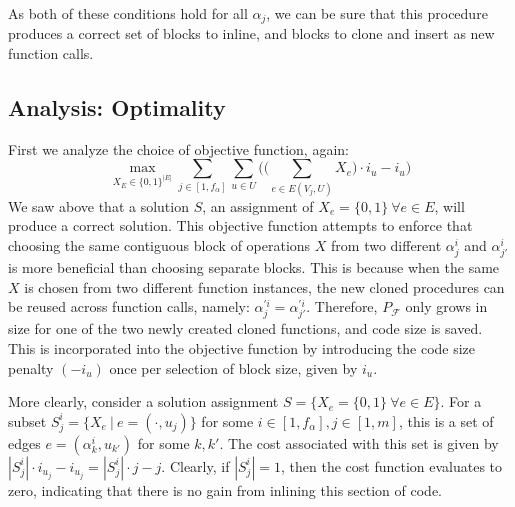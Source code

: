 \documentclass[12pt,twoside]{article}
\begin{document}
	As both of these conditions hold for all $\alpha_j$, we can be sure that this procedure produces a correct set of blocks to inline, and blocks to clone and insert as new function calls. 

\subsection{Analysis: Optimality}
First we analyze the choice of objective function, again:
	\begin{equation}
		\max_{X_E \in \{0,1\}^{|E|}} \sum_{j \in [1,f_{\alpha}]}  \sum_{u \in U}\bigg(\Big(\sum_{e \in E(V_j,U)} X_e\Big) \cdot i_u - i_u\bigg) 
	\end{equation}
	We saw above that a solution $S$, an assignment of $X_e = \{0,1\}\ \forall e\in E$, will produce a correct solution. This objective function attempts to enforce that choosing the same contiguous block of operations $X$ from two different $\alpha_j^i$ and $\alpha_{j'}^i$ is more beneficial than choosing separate blocks. This is because when the same $X$ is chosen from two different function instances, the new cloned procedures can be reused across function calls, namely: $\alpha_j^{'i} = \alpha_{j'}^{'i}$. Therefore, $P_{\mathcal{F}}$ only grows in size for one of the two newly created cloned functions, and code size is saved. This is incorporated into the objective function by introducing the code size penalty $(-i_u)$ once per selection of block size, given by $i_u$. 

	More clearly, consider a solution assignment $S = \{X_e = \{0,1\}\ \forall e \in E\}$. For a subset $S_j^i = \{X_e\ |\ e = (\cdot, u_j)\}$ for some $i \in [1,f_{\alpha}],j \in [1,m]$, this is a set of edges $e = (\alpha_k^i, u_{k'})$ for some $k,k'$. The cost associated with this set is given by $|S_j^i| \cdot i_{u_j} - i_{u_j} = |S_j^i| \cdot j - j$. Clearly, if $|S_j^i| = 1$, then the cost function evaluates to zero, indicating that there is no gain from inlining this section of code. 
\end{document}
